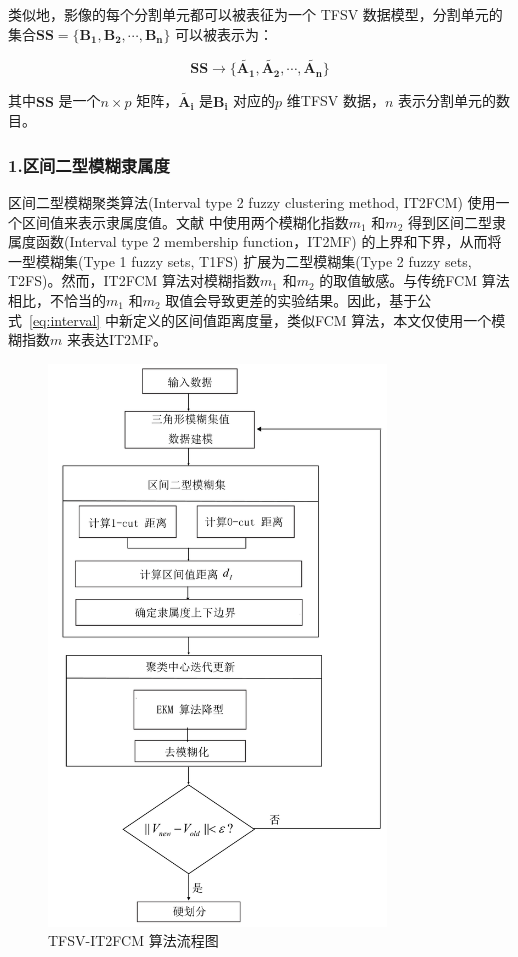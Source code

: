 类似地，影像的每个分割单元都可以被表征为一个 TFSV 数据模型，分割单元的集合$\bm{SS} = \lbrace \bm{B_1}, \bm{B_2},\bm{\cdots}, \bm{B_n} \rbrace$ 可以被表示为：

\begin{equation}\label{eq:eq-2}
    \bm{SS} \to \lbrace \bm{\tilde{A_1}}, \bm{\tilde{A_2}},\bm{\cdots}, \bm{\tilde{A_n}} \rbrace
\end{equation}

其中$\bm{SS}$ 是一个$n \times p$ 矩阵，$\bm{\tilde{A_i}}$ 是$\bm{B_i}$ 对应的$p$ 维TFSV 数据，$n$ 表示分割单元的数目。



\subsubsection*{1.区间二型模糊隶属度}
\label{subsec::chap04-3-3-2-1}
区间二型模糊聚类算法(Interval type 2 fuzzy clustering method, IT2FCM) 使用一个区间值来表示隶属度值。文献\cite{hwang2007uncertain} 中使用两个模糊化指数$m_1$ 和$m_2$ 得到区间二型隶属度函数(Interval type 2 membership function，IT2MF) 的上界和下界，从而将一型模糊集(Type 1 fuzzy sets, T1FS) 扩展为二型模糊集(Type 2 fuzzy sets, T2FS)。然而，IT2FCM 算法对模糊指数$m_1$ 和$m_2$ 的取值敏感。与传统FCM 算法相比，不恰当的$m_1$ 和$m_2$ 取值会导致更差的实验结果。因此，基于公式~\ref{eq:interval} 中新定义的区间值距离度量，类似FCM 算法，本文仅使用一个模糊指数$m$ 来表达IT2MF。


\begin{figure}[htbp]
    \centering
    \includegraphics[width=0.8\textwidth]{figures/tfsvit2}
    \caption{TFSV-IT2FCM 算法流程图}\label{fig:tfsvit2}
  \end{figure}

